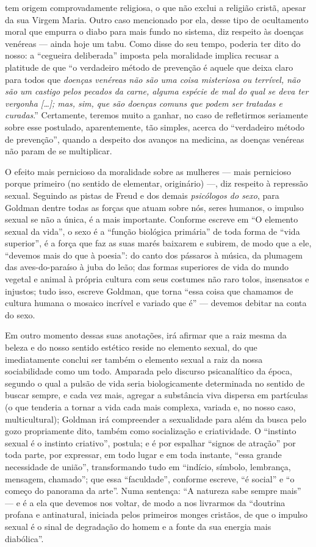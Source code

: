 tem origem comprovadamente religiosa, o que não exclui a religião
cristã, apesar da sua Virgem Maria. Outro caso mencionado por ela, desse
tipo de ocultamento moral que empurra o diabo para mais fundo no
sistema, diz respeito às doenças venéreas --- ainda hoje um tabu. Como
disse do seu tempo, poderia ter dito do nosso: a ``cegueira deliberada''
imposta pela moralidade implica recusar a platitude de que ``o
verdadeiro método de prevenção é aquele que deixa claro para todos que
\textit{doenças venéreas não são uma coisa misteriosa ou terrível, não são um
castigo pelos pecados da carne, alguma espécie de mal do qual se deva
ter vergonha {[}\ldots{]}; mas, sim, que são doenças comuns que podem ser
tratadas e curadas}.'' Certamente, teremos muito a ganhar, no caso de
refletirmos seriamente sobre esse postulado, aparentemente, tão simples,
acerca do ``verdadeiro método de prevenção'', quando a despeito dos
avanços na medicina, as doenças venéreas não param de se multiplicar.

O efeito mais pernicioso da moralidade sobre as mulheres --- mais
pernicioso porque primeiro (no sentido de elementar, originário) ---, diz
respeito à repressão sexual. Seguindo as pistas de Freud e dos demais
\textit{psicólogos do sexo}, para Goldman dentre todas as forças que atuam
sobre nós, seres humanos, o impulso sexual se não a única, é a mais
importante. Conforme escreve em ``O elemento sexual da vida'', o sexo é
a ``função biológica primária'' de toda forma de ``vida superior'', é a
força que faz as suas marés baixarem e subirem, de modo que a ele,
``devemos mais do que à poesia'': do canto dos pássaros à música, da
plumagem das aves-do-paraíso à juba do leão; das formas superiores de
vida do mundo vegetal e animal à própria cultura com seus costumes não
raro tolos, insensatos e injustos; tudo isso, escreve Goldman, que torna
``essa coisa que chamamos de cultura humana o mosaico incrível e variado
que é'' --- devemos debitar na conta do sexo. 

Em outro momento dessas
suas anotações, irá afirmar que a raiz mesma da beleza e do nosso
sentido estético reside no elemento sexual, do que imediatamente conclui
ser também o elemento sexual a raiz da nossa sociabilidade como um todo.
Amparada pelo discurso psicanalítico da época, segundo o qual a pulsão
de vida seria biologicamente determinada no sentido de buscar sempre, e
cada vez mais, agregar a substância viva dispersa em partículas (o que
tenderia a tornar a vida cada mais complexa, variada e, no nosso caso,
multicultural); Goldman irá compreender a sexualidade para além da busca
pelo gozo propriamente dito, também como socialização e criatividade. O
``instinto sexual é o instinto criativo'', postula; e é por espalhar
``signos de atração'' por toda parte, por expressar, em todo lugar e em
toda instante, ``essa grande necessidade de união'', transformando tudo
em ``indício, símbolo, lembrança, mensagem, chamado''; que essa
``faculdade'', conforme escreve, ``é social'' e ``o começo do panorama
da arte''. Numa sentença: ``A natureza sabe sempre mais'' --- e é a ela
que devemos nos voltar, de modo a nos livrarmos da ``doutrina profana e
antinatural, iniciada pelos primeiros monges cristãos, de que o impulso
sexual é o sinal de degradação do homem e a fonte da sua energia mais
diabólica''.

